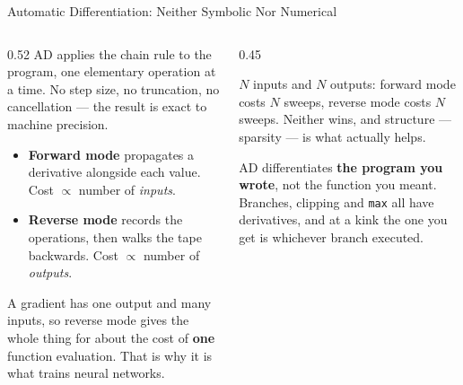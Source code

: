 \begin{frame}{Automatic Differentiation: Neither Symbolic Nor Numerical}
\begin{columns}[T]
\begin{column}{0.52\textwidth}
\small
AD applies the chain rule to the program, one elementary operation at a time. No step size, no truncation, no cancellation --- the result is exact to machine precision.
\medskip
\begin{itemize}\footnotesize
  \item \textbf{Forward mode} propagates a derivative alongside each value. Cost $\propto$ number of \emph{inputs}.
  \item \textbf{Reverse mode} records the operations, then walks the tape backwards. Cost $\propto$ number of \emph{outputs}.
\end{itemize}
\medskip
A gradient has one output and many inputs, so reverse mode gives the whole thing for about the cost of \textbf{one} function evaluation. That is why it is what trains neural networks.
\end{column}
\begin{column}{0.45\textwidth}
\begin{conceptbox}[title=\textbf{Which mode for a Jacobian?}]\small
$N$ inputs and $N$ outputs: forward mode costs $N$ sweeps, reverse mode costs $N$ sweeps. Neither wins, and structure --- sparsity --- is what actually helps.
\end{conceptbox}
\medskip
\begin{cautionbox}\footnotesize
AD differentiates \textbf{the program you wrote}, not the function you meant. Branches, clipping and \texttt{max} all have derivatives, and at a kink the one you get is whichever branch executed.
\end{cautionbox}
\end{column}
\end{columns}
\vspace{1mm}
\end{frame}

